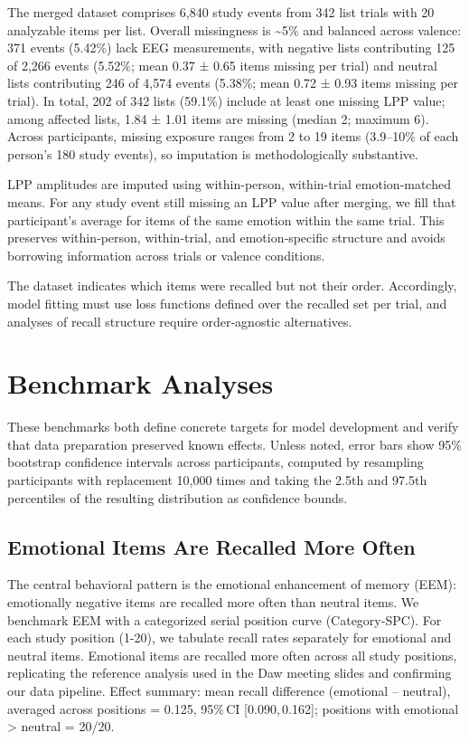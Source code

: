 \documentclass[
  man,
  longtable,
  nolmodern,
  notxfonts,
  notimes,
  draftfirst,
  colorlinks=true,linkcolor=blue,citecolor=blue,urlcolor=blue]{apa7}
\begin{document}
The merged dataset comprises 6,840 study events from 342 list trials
with 20 analyzable items per list. Overall missingness is
\textasciitilde5\% and balanced across valence: 371 events (5.42\%) lack
EEG measurements, with negative lists contributing 125 of 2,266 events
(5.52\%; mean 0.37 ± 0.65 items missing per trial) and neutral lists
contributing 246 of 4,574 events (5.38\%; mean 0.72 ± 0.93 items missing
per trial). In total, 202 of 342 lists (59.1\%) include at least one
missing LPP value; among affected lists, 1.84 ± 1.01 items are missing
(median 2; maximum 6). Across participants, missing exposure ranges from
2 to 19 items (3.9--10\% of each person's 180 study events), so
imputation is methodologically substantive.

LPP amplitudes are imputed using within-person, within-trial
emotion‑matched means. For any study event still missing an LPP value
after merging, we fill that participant's average for items of the same
emotion within the same trial. This preserves within‑person,
within‑trial, and emotion‑specific structure and avoids borrowing
information across trials or valence conditions.

The dataset indicates which items were recalled but not their order.
Accordingly, model fitting must use loss functions defined over the
recalled set per trial, and analyses of recall structure require
order‑agnostic alternatives.

\section{Benchmark Analyses}\label{benchmark-analyses}

These benchmarks both define concrete targets for model development and
verify that data preparation preserved known effects. Unless noted,
error bars show 95\% bootstrap confidence intervals across participants,
computed by resampling participants with replacement 10,000 times and
taking the 2.5th and 97.5th percentiles of the resulting distribution as
confidence bounds.

\subsection{Emotional Items Are Recalled More
Often}\label{emotional-items-are-recalled-more-often}

The central behavioral pattern is the emotional enhancement of memory
(EEM): emotionally negative items are recalled more often than neutral
items. We benchmark EEM with a categorized serial position curve
(Category-SPC). For each study position (1-20), we tabulate recall rates
separately for emotional and neutral items. Emotional items are recalled
more often across all study positions, replicating the reference
analysis used in the Daw meeting slides and confirming our data
pipeline. Effect summary: mean recall difference (emotional -- neutral),
averaged across positions = 0.125, 95\%\,CI {[}0.090,\,0.162{]};
positions with emotional \textgreater{} neutral = 20/20.
\end{document}
